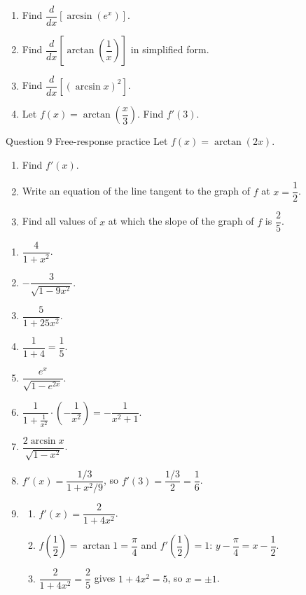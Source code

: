 \documentclass[11pt]{article}
\begin{document}
\begin{enumerate}[leftmargin=*,itemsep=2pt,start=5]
  \item Find $\dfrac{d}{dx}\left[\arcsin\!\left(e^{x}\right)\right]$.\work{2.8cm}
  \item Find $\dfrac{d}{dx}\left[\arctan\!\left(\dfrac1x\right)\right]$ in simplified form.\work{2.8cm}
  \item Find $\dfrac{d}{dx}\left[(\arcsin x)^2\right]$.\work{2.8cm}
  \item Let $f(x)=\arctan\!\left(\dfrac x3\right)$. Find $f'(3)$.\work{2.8cm}
\end{enumerate}

\begin{frbox}{Question 9 \textperiodcentered{} Free-response practice}
Let $f(x)=\arctan(2x)$.
\begin{enumerate}[label=(\alph*),leftmargin=*,itemsep=2pt]
  \item Find $f'(x)$.\work{2.6cm}
  \item Write an equation of the line tangent to the graph of $f$ at $x=\dfrac12$.\work{2.6cm}
  \item Find all values of $x$ at which the slope of the graph of $f$ is $\dfrac25$.\work{2.6cm}
\end{enumerate}
\end{frbox}

\newpage
\begin{solbox}
\begin{enumerate}[leftmargin=*,itemsep=4pt]
  \item $\dfrac{4}{1+x^2}$.
  \item $-\dfrac{3}{\sqrt{1-9x^2}}$.
  \item $\dfrac{5}{1+25x^2}$.
  \item $\dfrac{1}{1+4}=\dfrac15$.
  \item $\dfrac{e^{x}}{\sqrt{1-e^{2x}}}$.
  \item $\dfrac{1}{1+\frac{1}{x^2}}\cdot\left(-\dfrac{1}{x^2}\right)=-\dfrac{1}{x^2+1}$.
  \item $\dfrac{2\arcsin x}{\sqrt{1-x^2}}$.
  \item $f'(x)=\dfrac{1/3}{1+x^2/9}$, so $f'(3)=\dfrac{1/3}{2}=\dfrac16$.
  \item \begin{enumerate}[label=(\alph*),leftmargin=*,itemsep=3pt]
    \item $f'(x)=\dfrac{2}{1+4x^2}$.
    \item $f\!\left(\dfrac12\right)=\arctan1=\dfrac\pi4$ and $f'\!\left(\dfrac12\right)=1$: $y-\dfrac\pi4=x-\dfrac12$.
    \item $\dfrac{2}{1+4x^2}=\dfrac25$ gives $1+4x^2=5$, so $x=\pm1$.
  \end{enumerate}
\end{enumerate}
\end{solbox}
\end{document}
